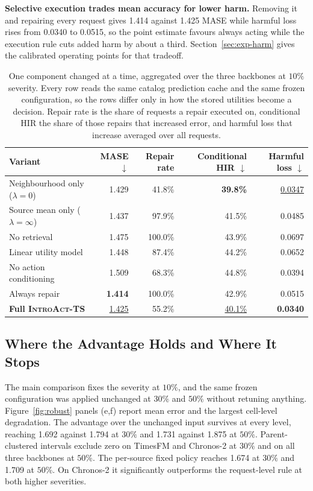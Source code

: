 \documentclass{article}
\newcommand{\best}[1]{\textbf{#1}}
\newcommand{\second}[1]{\underline{#1}}
\newcommand{\introact}{\textsc{IntroAct-TS}}
\begin{document}
\textbf{Selective execution trades mean accuracy for lower harm.} Removing it and repairing
every request gives 1.414 against 1.425 MASE while harmful loss rises from 0.0340 to 0.0515,
so the point estimate favours always acting while the execution rule cuts added harm by about a third.
Section~\ref{sec:exp-harm} gives the calibrated operating points for that tradeoff.

\begin{table}[!t]
  \caption{One component changed at a time, aggregated over the three backbones at $10\%$
  severity. Every row reads the same catalog prediction cache and the same frozen
  configuration, so the rows differ only in how the stored utilities become a decision. Repair
  rate is the share of requests a repair executed on, conditional HIR the share of those
  repairs that increased error, and harmful loss that increase averaged over all requests.}
  \label{tab:ablation}
  \centering
  \small
  \setlength{\tabcolsep}{4pt}
\begin{tabularx}{\textwidth}{@{}Xrrrr@{}}
    \toprule
    Variant & MASE $\downarrow$ & Repair rate & Conditional HIR $\downarrow$ & Harmful loss $\downarrow$ \\
    \midrule
    Neighbourhood only ($\lambda=0$) & 1.429 & 41.8\% & \best{39.8\%} & \second{0.0347} \\
    Source mean only ($\lambda=\infty$) & 1.437 & 97.9\% & 41.5\% & 0.0485 \\
    No retrieval & 1.475 & 100.0\% & 43.9\% & 0.0697 \\
    Linear utility model & 1.448 & 87.4\% & 44.2\% & 0.0652 \\
    No action conditioning & 1.509 & 68.3\% & 44.8\% & 0.0394 \\
    \midrule
    Always repair & \best{1.414} & 100.0\% & 42.9\% & 0.0515 \\
    \midrule
    \rowcolor{bestgray}\textbf{Full \introact{}} & \second{1.425} & 55.2\% & \second{40.1\%} & \best{0.0340} \\
\bottomrule
  \end{tabularx}
\end{table}

\subsection{Where the Advantage Holds and Where It Stops}
\label{sec:exp-robust}
The main comparison fixes the severity at $10\%$, and the same frozen configuration was
applied unchanged at $30\%$ and $50\%$ without retuning anything. Figure~\ref{fig:robust}
panels (e,f) report mean error and the largest cell-level degradation. The advantage over the unchanged input survives at every level, reaching
1.692 against 1.794 at $30\%$ and 1.731 against 1.875 at $50\%$. Parent-clustered intervals
exclude zero on TimesFM and Chronos-2 at $30\%$ and on all three backbones at $50\%$. The
per-source fixed policy reaches 1.674 at $30\%$ and 1.709 at $50\%$. On Chronos-2 it
significantly outperforms the request-level rule at both higher severities.
\end{document}
